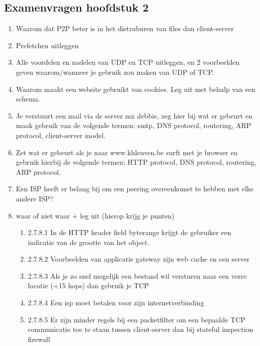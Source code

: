 \subsection{Examenvragen hoofdstuk 2}
\begin{enumerate}
\item Waarom dat P2P beter is in het distruburen van files dan client-server

\item Prefetchen uitleggen

\item Alle voordelen en nadelen van UDP en TCP uitleggen, en 2 voorbeelden geven waarom/wanneer je gebruik zou maken van UDP of TCP.

\item Waarom maakt een website gebruikt van cookies. Leg uit met behulp van een schema.

\item Je verstuurt een mail via de server mx debbie, zeg hier bij wat er gebeurt en maak gebruik van de volgende termen: smtp, DNS protocol, routering, ARP protocol, client-server model.

\item Zet wat er gebeurt als je naar www.khleuven.be surft met je browser en gebruik hierbij de volgende termen: HTTP protocol, DNS protocol, routering, ARP protocol.

\item Een ISP heeft er belang bij om een peering overeenkomst te hebben met elke andere ISP?

\clearpage

\item waar of niet waar + leg uit (hierop krijg je punten)

    \begin{enumerate}
        \item 2.7.8.1	In de HTTP header field byterange krijgt de gebruiker een indicatie van de grootte van het object.

        \item 2.7.8.2	Voorbeelden van applicatie gateway zijn web cache en een server

        \item 2.7.8.3	Als je zo snel mogelijk een bestand wil versturen naar een verre locatie (+15 hops) dan gebruik je TCP

        \item 2.7.8.4	Een isp moet betalen voor zijn internetverbinding

        \item 2.7.8.5	Er zijn minder regels bij een packetfilter om een bepaalde TCP communicatie toe te staan tussen client-server dan bij stateful inspection firewall


\end{enumerate}
\end{enumerate}
